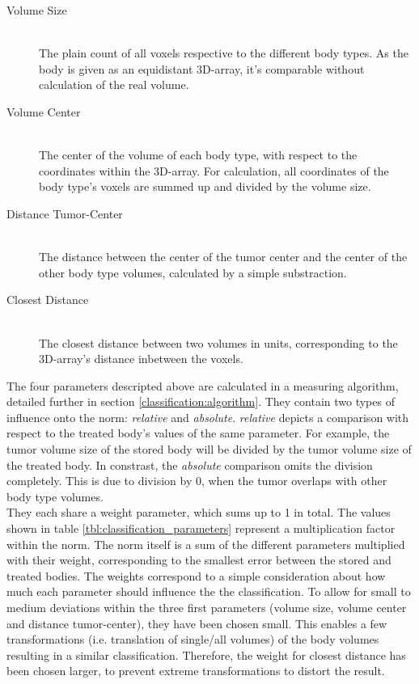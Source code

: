 \begin{description}
\item[Volume Size]~\\
The plain count of all voxels respective to the different body types. As the body is given as an equidistant 3D-array, it's comparable without calculation of the real volume.
\item[Volume Center]~\\ The center of the volume of each body type, with respect to the coordinates within the 3D-array. For calculation, all coordinates of the body type's voxels are summed up and divided by the volume size.
\item[Distance Tumor-Center]~\\ The distance between the center of the tumor center and the center of the other body type volumes, calculated by a simple substraction.
\item[Closest Distance]~\\ The closest distance between two volumes in units, corresponding to the 3D-array's distance inbetween the voxels.
\end{description}

The four parameters descripted above are calculated in a measuring algorithm, detailed further in section \ref{classification:algorithm}. They contain two types of influence onto the norm: \textit{relative} and \textit{absolute}. \textit{relative} depicts a comparison with respect to the treated body's values of the same parameter. For example, the tumor volume size of the stored body will be divided by the tumor volume size of the treated body. In constrast, the \textit{absolute} comparison omits the division completely. This is due to division by 0, when the tumor overlaps with other body type volumes. \\

They each share a weight parameter, which sums up to 1 in total. The values shown in table \ref{tbl:classification_parameters} represent a multiplication factor within the norm. The norm itself is a sum of the different parameters multiplied with their weight, corresponding to the smallest error between the stored and treated bodies. The weights correspond to a simple consideration about how much each parameter should influence the the classification. To allow for small to medium deviations within the three first parameters (volume size, volume center and distance tumor-center), they have been chosen small. This enables a few transformations (i.e. translation of single/all volumes) of the body volumes resulting in a similar classification. Therefore, the weight for closest distance has been chosen larger, to prevent extreme transformations to distort the result. \\

